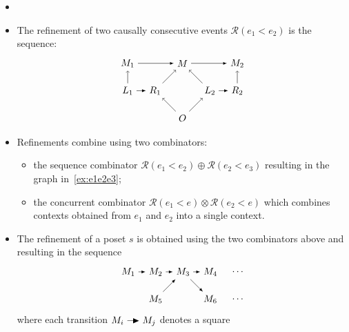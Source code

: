 \begin{definition}
  \begin{itemize}
  \item[]
  \item The refinement of two causally consecutive events $\mathcal{R}(e_1< e_2)$ is the sequence:
    \[
    \begin{tikzpicture} %
      \node (o) at (0,-1) {\(O\)};
      \node (p) at (0,1) {\(M\)};
      \node (r1) at (-1,0) {\(R_1\)};
      \node (l1) at (-2,0) {\(L_1\)};
      \node (l2) at (1,0) {\(L_2\)};
      \node (r2) at (2,0) {\(R_2\)};
      \node (m1) at (-2,1) {\(M_1\)};
      \node (m2) at (2,1) {\(M_2\)};
      \draw [->] (l1) -- (m1);
      \draw [->] (r2) -- (m2);
      \draw [->] (o) -- (r1);
      \draw [->] (o) -- (l2);
      \draw [->] (r1) -- (p);
      \draw [->] (l2) -- (p);
      \draw [>=latex, ->] (m1) -- (p);
      \draw [>=latex, ->] (p) -- (m2);
      \draw [>=latex, ->] (l1) -- (r1);
      \draw [>=latex, ->] (l2) -- (r2);
    \end{tikzpicture}
    \]
    \item Refinements combine using two combinators:
      \begin{itemize}
      \item the sequence combinator $\mathcal{R}(e_1 < e_2)\oplus\mathcal{R}(e_2 < e_3)$ resulting in the graph in~\autoref{ex:e1e2e3};
      \item the concurrent combinator $\mathcal{R}(e_1 < e)\otimes\mathcal{R}(e_2 < e)$ which combines contexts obtained from $e_1$ and $e_2$ into a single context.
      \end{itemize}
  \item The refinement of a poset $s$ is obtained using the two combinators above and resulting in the sequence
    \[
    \begin{tikzpicture} %
      \node (m1) at (0,0) {\(M_1\)};
      \node (m2) at (1,0) {\(M_2\)};
      \node (m3) at (2,0) {\(M_3\)};
      \node (m4) at (3,0) {\(M_4\)};
      \node (m5) at (1,-1) {\(M_5\)};
      \node (m6) at (3,-1) {\(M_6\)};
      \node (m7) at (4,-1) {\(\cdots\)};
      \node (m8) at (4,0) {\(\cdots\)};
      \draw [>=latex, ->] (m1) -- (m2);
      \draw [>=latex, ->] (m2) -- (m3);
      \draw [>=latex, ->] (m3) -- (m4);
      \draw [>=latex, ->] (m5) -- (m3);
      \draw [>=latex, ->] (m3) -- (m6);
    \end{tikzpicture}
    \]
    where each transition $M_i\action M_j$ denotes a square
    \[
\]
\end{itemize}
\end{definition}
